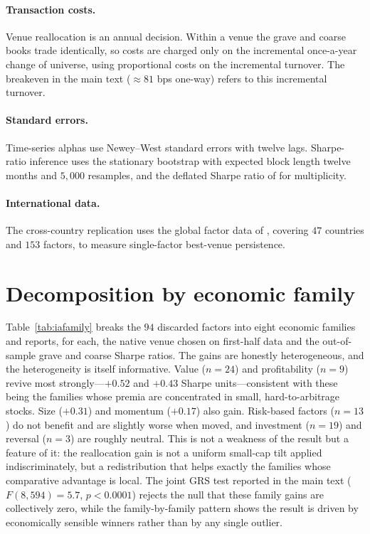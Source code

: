 \documentclass[12pt]{article}
\theoremstyle{plain}
\theoremstyle{definition}
\begin{document}
\paragraph{Transaction costs.} Venue reallocation is an annual decision. Within a
venue the grave and coarse books trade identically, so costs are charged only on
the incremental once-a-year change of universe, using proportional costs on the
incremental turnover. The breakeven in the main text ($\approx 81$ bps one-way)
refers to this incremental turnover.

\paragraph{Standard errors.} Time-series alphas use Newey--West
\citeyearpar{NeweyWest1987} standard errors with twelve lags. Sharpe-ratio
inference uses the \citet{PolitisRomano1994} stationary bootstrap with expected
block length twelve months and $5{,}000$ resamples, and the deflated Sharpe ratio
of \citet{BaileyLopezdePrado2014} for multiplicity.

\paragraph{International data.} The cross-country replication uses the global
factor data of \citet{JensenKellyPedersen2023}, covering $47$ countries and
$153$ factors, to measure single-factor best-venue persistence.

\section{Decomposition by economic family}
\label{ia:family}

Table~\ref{tab:iafamily} breaks the $94$ discarded factors into eight economic
families and reports, for each, the native venue chosen on first-half data and
the out-of-sample grave and coarse Sharpe ratios. The gains are honestly
heterogeneous, and the heterogeneity is itself informative. Value ($n=24$) and
profitability ($n=9$) revive most strongly---$+0.52$ and $+0.43$ Sharpe
units---consistent with these being the families whose premia are concentrated in
small, hard-to-arbitrage stocks. Size ($+0.31$) and momentum ($+0.17$) also gain.
Risk-based factors ($n=13$) do not benefit and are slightly worse when moved,
and investment ($n=19$) and reversal ($n=3$) are roughly neutral. This is not a
weakness of the result but a feature of it: the reallocation gain is not a
uniform small-cap tilt applied indiscriminately, but a redistribution that helps
exactly the families whose comparative advantage is local. The joint GRS test
reported in the main text ($F(8,594)=5.7$, $p<0.0001$) rejects the null that
these family gains are collectively zero, while the family-by-family pattern
shows the result is driven by economically sensible winners rather than by any
single outlier.
\end{document}
